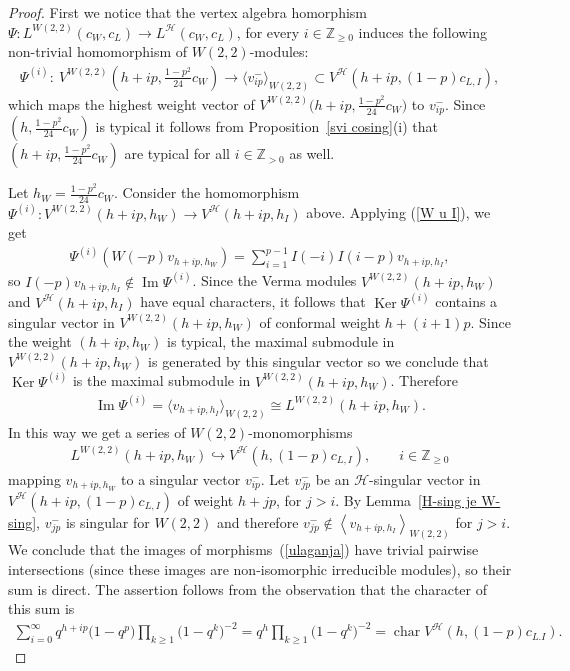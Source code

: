 \documentclass[pdftex]{sigma}
\numberwithin{equation}{section}
\newcommand{\N}{{\mathbb Z}_{> 0} }
\newcommand{\Zp}{{\mathbb Z}_{\geq 0} }
\newcommand{\Z}{\mathbb Z}
\newcommand{\HVir}{\mathcal H}
\DeclareMathOperator{\Ker}{Ker}
\begin{document}
\begin{proof} First we notice that the vertex algebra homorphism $\Psi \colon L^{W(2,2)} (c_W, c_L) \rightarrow L^{ \HVir } (c_W, c_L) $, for every $i \in {\Z}_{\ge 0}$ induces the following non-trivial homomorphism of $W(2,2)$-modules:
\begin{gather*}
\Psi ^{(i)} \colon \ V^{W( 2,2)}\left(h+ip,\frac{1-p^{2}}{24}c_{W}\right) \rightarrow \langle v_{ip}^- \rangle_{W(2,2) } \subset V^{\HVir}(h+ip,(1-p) c_{L,I}) ,
\end{gather*}
which maps the highest weight vector of $V^{W( 2,2)}\big(h+ip,\frac{1-p^{2}}{24}c_{W}\big) $ to $v_{ip}^- $. Since $(h,\frac{1-p^{2}}{24}c_{W})$ is typical it follows from Proposition~\ref{svi cosing}(i) that $(h+ip,\frac{1-p^{2}}{24}c_{W})$ are typical for all $i\in\N$ as well.

Let $h_W=\frac{1-p^2}{24}c_W$. Consider the homomorphism $\Psi ^{(i)} \colon V^{ W(2,2) }(h+ ip ,h_W) \rightarrow V^{\HVir}(h+ip,h_I) $ above. Applying (\ref{W u I}), we get
\begin{gather*}
\Psi^{(i)} (W(-p) v_{h+ip ,h_{W}}) =\sum_{i=1}^{p-1}I(-i) I(i-p) v_{h+ip ,h_{I}},
\end{gather*}
so $I(-p)v_{h+ip ,h_I} \notin\operatorname{Im} \Psi ^{(i )} $. Since the Verma modules $V^{W(2,2)}(h+ip ,h_W) $ and $V^{\HVir}(h+i p ,h_I)$ have equal characters, it follows that $\Ker \Psi^{(i )} $ contains a singular vector in $V^{ W(2,2) }(h+ i p ,h_W) $ of conformal weight $ h + (i+1) p$.
Since the weight $(h+ip, h_W)$ is typical, the maximal submodule in $V^{W(2,2)}(h+i p ,h_{W}) $ is generated by this singular vector so we conclude that $\Ker \Psi ^{(i )} $ is the maximal submodule in $V^{W(2,2)}(h+i p ,h_{W}) $. Therefore
\begin{gather*}
\operatorname{Im} \Psi ^{(i )} = \langle v_{h+ ip ,h_{I}} \rangle _{W(2,2)}\cong L^{W(2,2)}(h+ i p ,h_W).
\end{gather*}
In this way we get a series of $W(2,2)$-monomorphisms
\begin{gather}
L^{W(2,2)}(h+ip,h_{W}) \hookrightarrow V^{\HVir}(h,(1-p) c_{L,I}) ,\qquad i\in\Zp \label{ulaganja}
\end{gather}
mapping $v_{h+ip,h_{W}}$ to a singular vector $v_{ip}^-$. Let $v_{j p}^-$ be an $\HVir$-singular vector in $V^{\HVir}(h + i p ,(1-p) c_{L,I})$ of weight $h + j p$, for $j > i$. By Lemma~\ref{H-sing je W-sing}, $v_{j p} ^- $ is singular for $W(2,2)$ and therefore $v_{j p}^- \notin \left\langle v_{h+ i p ,h_{I}}\right\rangle _{W(2,2)}$ for $j > i$. We conclude that the images of morphisms~(\ref{ulaganja}) have trivial pairwise intersections (since these images are non-isomorphic irreducible modules), so their sum is direct. The assertion follows from the observation that the character of this sum is
\begin{gather*}
\sum_{i =0} ^{\infty} q^{h+ i p }\big(1-q^{p}\big)\prod\limits_{k\geq1}\big(1-q^{k}\big)^{-2} = q^{h } \prod\limits_{k\geq1}\big(1-q^{k}\big)^{-2} = \operatorname{char} V^{\HVir} (h, (1-p)c_{L.I} ). \tag*{\qed}
\end{gather*}
\renewcommand{\qed}{}
\end{proof}
\end{document}
